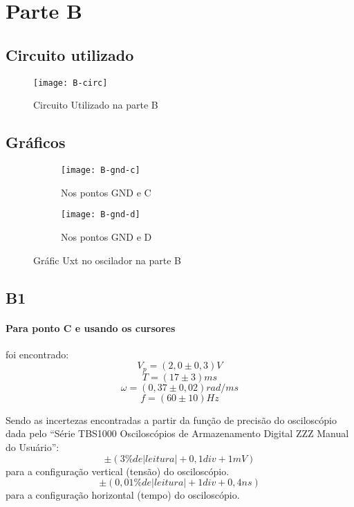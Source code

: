 \section{Parte B}
    \subsection{Circuito utilizado}
        \begin{figure} [H] 
            \texttt{[image: B-circ]}
            \caption{Circuito Utilizado na parte B}
            \label{fig:B-circ}
        \end{figure}
    \subsection{Gráficos}
        \begin{figure} [H] 
            \begin{subfigure}[b]{7cm}  
                \texttt{[image: B-gnd-c]}
                \caption{Nos pontos GND e C}
                \label{fig:B-gnd-c}
            \end{subfigure}
            \begin{subfigure}[b]{7cm}  
                \texttt{[image: B-gnd-d]}
                \caption{Nos pontos GND e D}
                \label{fig:B-gnd-d}
            \end{subfigure}
                \caption{Gráfic Uxt no oscilador na parte B}
        \end{figure}
    \subsection{B1}
        \paragraph{Para ponto C e usando os cursores} foi encontrado:
        $$V_p = (2,0 \pm 0,3)V$$
        $$T = (17 \pm 3)ms$$
        $$\omega = (0,37 \pm 0,02)rad/ms$$
        $$f = (60 \pm 10)Hz$$

        Sendo as incertezas encontradas a partir 
        da função de precisão do osciloscópio 
        dada pelo “Série TBS1000 Osciloscópios de 
        Armazenamento Digital ZZZ Manual do Usuário”:
        $$\pm(3\% de |leitura| + 0,1 div + 1mV)$$
        para a configuração vertical (tensão) 
        do osciloscópio.
        $$\pm(0,01\% de |leitura| + 1 div + 0,4ns)$$
        para a configuração horizontal (tempo) 
        do osciloscópio.

